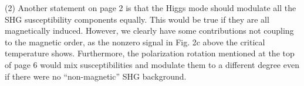 (2) Another statement on page 2 is that the Higgs mode should modulate all the SHG susceptibility components equally. This would be true if they are all magnetically induced. However, we clearly have some contributions not coupling to the magnetic order, as the nonzero signal in Fig. 2c above the critical temperature shows. Furthermore, the polarization rotation mentioned at the top of page 6 would mix susceptibilities and modulate them to a different degree even if there were no ``non-magnetic'' SHG background.
